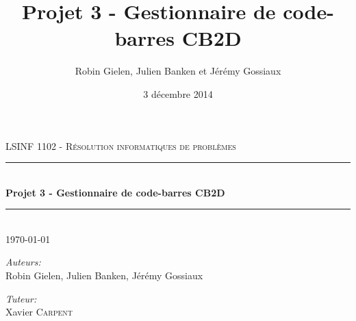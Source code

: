 \documentclass[10pt]{article}
\title{Projet 3 - Gestionnaire de code-barres CB2D}
\date{3 décembre 2014}
\author{Robin Gielen, Julien Banken et Jérémy Gossiaux}
\newcommand{\HRule}{\rule{\linewidth}{0.5mm}}
\begin{document}
\begin{titlepage}
\begin{center}


\textsc{\Large LSINF 1102 - Résolution informatiques de problèmes}\\[0.5cm]

\HRule \\[0.4cm]
{ \huge \bfseries Projet 3 - Gestionnaire de code-barres CB2D \\[0.4cm] }

\HRule \\[1.5cm]

{\large \today}

\vfill

\noindent
\begin{minipage}{0.4\textwidth}
\begin{flushleft} \large
\emph{Auteurs:}\\
Robin Gielen, Julien Banken, Jérémy Gossiaux \textsc{} 
\end{flushleft}
\end{minipage}%
\begin{minipage}{0.4\textwidth}
\begin{flushright} \large
\emph{Tuteur:} \\
Xavier \textsc{Carpent}
\end{flushright}
\end{minipage}



\end{center}
\end{titlepage}










\end{document}
